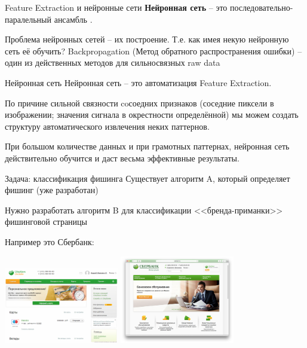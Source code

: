 \begin{frame}{Feature Extraction и нейронные сети}
	\textbf{Нейронная сеть} --
	это последовательно-паралельный ансамбль 
	.
	
	
	Проблема нейронных сетей -- их построение. Т.е.
	как имея некую нейронную сеть её обучить?
	Backpropagation (Метод обратного распространения ошибки) 
	-- один из действенных методов для сильносвязных raw data
\end{frame}

\begin{frame}{Нейронная сеть}
	Нейронная сеть -- это автоматизация Feature Extraction.
	
	По причине сильной связности coсоедних признаков
	(соседние пиксели в изображении; значения сигнала в окрестности определённой)
	мы можем создать структуру автоматического извлечения неких паттернов.
	
	При большом количестве данных и при грамотных паттернах, нейронная сеть
	действительно обучится и даст весьма эффективные результаты.
	
\end{frame}

\begin{frame}{Задача: классификация фишинга}
	\small
	Существует алгоритм A, который определяет фишинг (уже разработан)
	
	Нужно разработать алгоритм B для классификации <<бренда-приманки>> фишинговой страницы
	
	Например это Сбербанк:
	
	\includegraphics[width=5cm]{../pic/sber1.png}
	\includegraphics[width=5cm]{../pic/sber2.png}
	
\end{frame}

